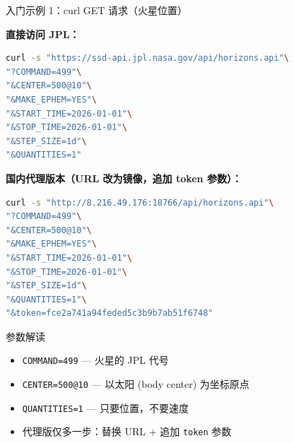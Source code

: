 \documentclass[aspectratio=169]{ctexbeamer}
\begin{document}
\begin{frame}{入门示例 1：curl GET 请求（火星位置）}
\small

\textbf{直接访问 JPL：}

\begin{lstlisting}[language=bash]
curl -s "https://ssd-api.jpl.nasa.gov/api/horizons.api"\
"?COMMAND=499"\
"&CENTER=500@10"\
"&MAKE_EPHEM=YES"\
"&START_TIME=2026-01-01"\
"&STOP_TIME=2026-01-01"\
"&STEP_SIZE=1d"\
"&QUANTITIES=1"
\end{lstlisting}

\vspace{0.15cm}

\textbf{国内代理版本（URL 改为镜像，追加 token 参数）：}

\begin{lstlisting}[language=bash]
curl -s "http://8.216.49.176:18766/api/horizons.api"\
"?COMMAND=499"\
"&CENTER=500@10"\
"&MAKE_EPHEM=YES"\
"&START_TIME=2026-01-01"\
"&STOP_TIME=2026-01-01"\
"&STEP_SIZE=1d"\
"&QUANTITIES=1"\
"&token=fce2a741a94feded5c3b9b7ab51f6748"
\end{lstlisting}

\vspace{0.15cm}

\begin{block}{参数解读}
\begin{itemize}
  \setlength\itemsep{1pt}
  \item \texttt{COMMAND=499} — 火星的 JPL 代号
  \item \texttt{CENTER=500@10} — 以太阳 (body center) 为坐标原点
  \item \texttt{QUANTITIES=1} — 只要位置，不要速度
  \item 代理版仅多一步：替换 URL + 追加 \texttt{token} 参数
\end{itemize}
\end{block}
\end{frame}
\end{document}
